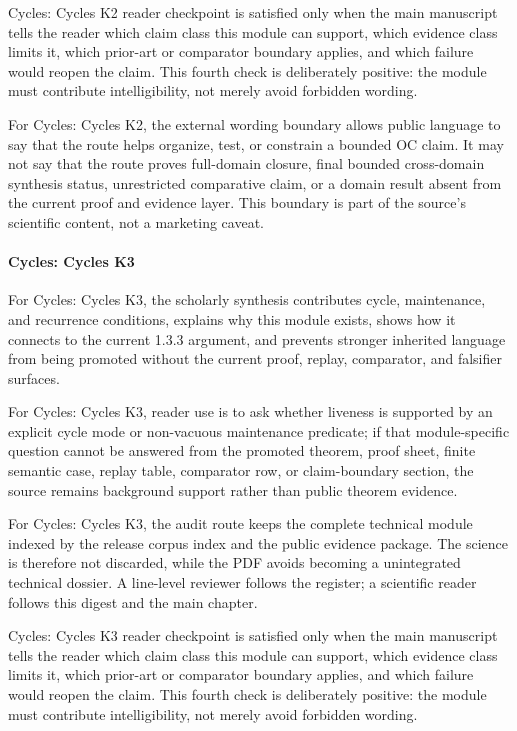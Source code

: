 Cycles: Cycles K2 reader checkpoint is satisfied only when the main manuscript tells the reader which claim class this module can support, which evidence class limits it, which prior-art or comparator boundary applies, and which failure would reopen the claim. This fourth check is deliberately positive: the module must contribute intelligibility, not merely avoid forbidden wording.


For Cycles: Cycles K2, the external wording boundary allows public language to say that the route helps organize, test, or constrain a bounded OC claim. It may not say that the route proves full-domain closure, final bounded cross-domain synthesis status, unrestricted comparative claim, or a domain result absent from the current proof and evidence layer. This boundary is part of the source's scientific content, not a marketing caveat.


\paragraph{Cycles: Cycles K3}

For Cycles: Cycles K3, the scholarly synthesis contributes cycle, maintenance, and recurrence conditions, explains why this module exists, shows how it connects to the current 1.3.3 argument, and prevents stronger inherited language from being promoted without the current proof, replay, comparator, and falsifier surfaces.


For Cycles: Cycles K3, reader use is to ask whether liveness is supported by an explicit cycle mode or non-vacuous maintenance predicate; if that module-specific question cannot be answered from the promoted theorem, proof sheet, finite semantic case, replay table, comparator row, or claim-boundary section, the source remains background support rather than public theorem evidence.


For Cycles: Cycles K3, the audit route keeps the complete technical module indexed by the release corpus index and the public evidence package. The science is therefore not discarded, while the PDF avoids becoming a unintegrated technical dossier. A line-level reviewer follows the register; a scientific reader follows this digest and the main chapter.


Cycles: Cycles K3 reader checkpoint is satisfied only when the main manuscript tells the reader which claim class this module can support, which evidence class limits it, which prior-art or comparator boundary applies, and which failure would reopen the claim. This fourth check is deliberately positive: the module must contribute intelligibility, not merely avoid forbidden wording.


